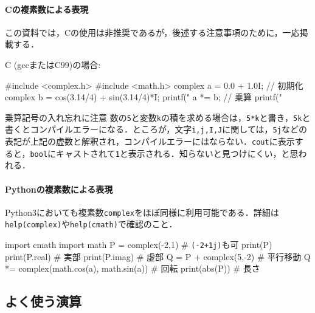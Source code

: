 \paragraph{Cの複素数による表現} この資料では，Cの使用は非推奨であるが，後述する注意事項のために，一応掲載する．

C (gccまたはC99)の場合:
\begin{purecbox}[emph={complex,creal,cimag}]
#include <complex.h>
#include <math.h>
complex a = 0.0 + 1.0I; // 初期化
complex b = cos(3.14/4) + sin(3.14/4)*I;
printf("
a *= b; // 乗算
printf("
\end{purecbox}

\begin{debugbox}{乗算記号の入れ忘れに注意}
  数の\texttt{5}と変数\texttt{k}の積を求める場合は，\texttt{5*k}と書き，\texttt{5k}と書くとコンパイルエラーになる．ところが，文字\texttt{i,j,I,J}に関しては，\texttt{5j}などの表記が上記の虚数と解釈され，コンパイルエラーにはならない．\texttt{cout}に表示すると，\texttt{bool}にキャストされて\texttt{1}と表示される．知らないと見つけにくい，と思われる．
\end{debugbox}

\medskip

\paragraph{Pythonの複素数による表現} Python3においても複素数\texttt{complex}をほぼ同様に利用可能である．詳細は\texttt{help(complex)}や\texttt{help(cmath)}で確認のこと．
\begin{pybox}[emph={real,imag,complex}]
import cmath
import math
P = complex(-2,1) # \texttt{(-2+1j)}も可
print(P)
print(P.real)     # 実部
print(P.imag)     # 虚部
Q = P + complex(5,-2)     # 平行移動
Q *= complex(math.cos(a), math.sin(a))     # 回転
print(abs(P))     # 長さ
\end{pybox}
\subsection{よく使う演算}

